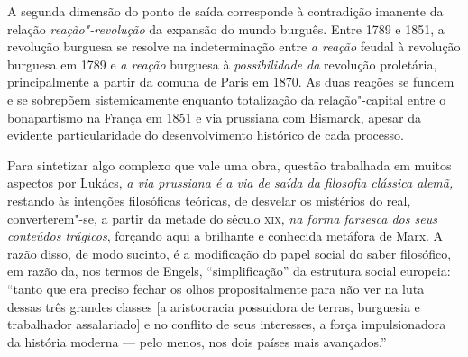 A segunda dimensão do ponto de saída corresponde à contradição imanente
da relação \emph{reação"-revolução} da expansão do mundo burguês. Entre
1789 e 1851, a revolução burguesa se resolve na indeterminação entre
\emph{a reação} feudal à revolução burguesa em 1789 e \emph{a reação}
burguesa à \emph{possibilidade da} revolução proletária, principalmente
a partir da comuna de Paris em 1870. As duas reações se fundem e se
sobrepõem sistemicamente enquanto totalização da relação"-capital entre o
bonapartismo na França em 1851 e via prussiana com Bismarck, apesar da
evidente particularidade do desenvolvimento histórico de cada processo.

Para sintetizar algo complexo que vale uma obra, questão trabalhada em
muitos aspectos por Lukács, \emph{a via prussiana é a via de saída da
filosofia clássica alemã,} restando às intenções filosóficas teóricas,
de desvelar os mistérios do real, converterem"-se, a partir da metade do
século \textsc{xix}, \emph{na forma farsesca dos seus conteúdos
trágicos}, forçando aqui a brilhante e conhecida metáfora de Marx. A
razão disso, de modo sucinto, é a modificação do papel social do saber
filosófico, em razão da, nos termos de Engels, ``simplificação'' da
estrutura social europeia: ``tanto que era preciso fechar os olhos
propositalmente para não ver na luta dessas três grandes classes {[}a
aristocracia possuidora de terras, burguesia e trabalhador
assalariado{]} e no conflito de seus interesses, a força impulsionadora
da história moderna --- pelo menos, nos dois países mais avançados.''

